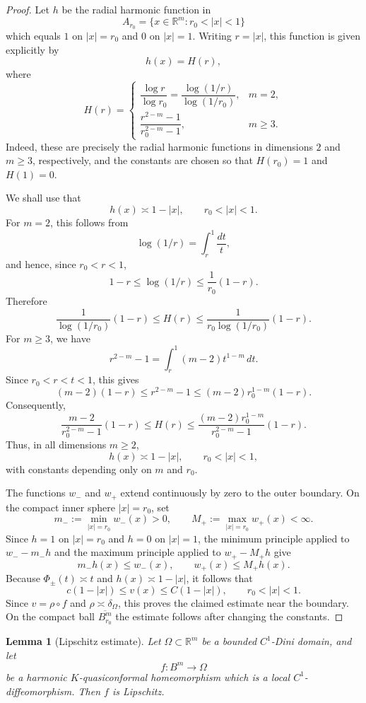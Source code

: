 \documentclass[11pt]{amsart}
\newtheorem{lemma}[theorem]{Lemma}
\theoremstyle{definition}
\theoremstyle{remark}
\newcommand{\R}{\mathbb R}
\begin{document}
\begin{proof}
Let \(h\) be the radial harmonic function in
\[
        A_{r_0}=\{x\in \mathbb R^m:r_0<|x|<1\}
\]
which equals \(1\) on \(|x|=r_0\) and \(0\) on \(|x|=1\).  Writing
\(r=|x|\), this function is given explicitly by
\[
h(x)=H(r),
\]
where
\[
H(r)=
\begin{cases}
\dfrac{\log r}{\log r_0}
      =\dfrac{\log(1/r)}{\log(1/r_0)}, & m=2, \\[1.2em]
\dfrac{r^{2-m}-1}{r_0^{2-m}-1}, & m\ge 3 .
\end{cases}
\]
Indeed, these are precisely the radial harmonic functions in dimensions
\(2\) and \(m\ge 3\), respectively, and the constants are chosen so that
\(H(r_0)=1\) and \(H(1)=0\).

We shall use that
\[
        h(x)\asymp 1-|x|,
        \qquad r_0<|x|<1 .
\]
For \(m=2\), this follows from
\[
        \log(1/r)=\int_r^1 \frac{dt}{t},
\]
and hence, since \(r_0<r<1\),
\[
        1-r \le \log(1/r)\le \frac{1}{r_0}(1-r).
\]
Therefore
\[
        \frac{1}{\log(1/r_0)}(1-r)
        \le H(r)
        \le
        \frac{1}{r_0\log(1/r_0)}(1-r).
\]
For \(m\ge 3\), we have
\[
        r^{2-m}-1
        =
        \int_r^1 (m-2)t^{1-m}\,dt .
\]
Since \(r_0<r<t<1\), this gives
\[
        (m-2)(1-r)
        \le r^{2-m}-1
        \le
        (m-2)r_0^{1-m}(1-r).
\]
Consequently,
\[
        \frac{m-2}{r_0^{2-m}-1}(1-r)
        \le H(r)
        \le
        \frac{(m-2)r_0^{1-m}}{r_0^{2-m}-1}(1-r).
\]
Thus, in all dimensions \(m\ge 2\),
\[
        h(x)\asymp 1-|x|,
        \qquad r_0<|x|<1,
\]
with constants depending only on \(m\) and \(r_0\).


The functions \(w_-\) and \(w_+\) extend continuously by zero to the
outer boundary. On the compact inner sphere \(|x|=r_0\), set
\[
        m_-:=\min_{|x|=r_0}w_-(x)>0,
        \qquad
        M_+:=\max_{|x|=r_0}w_+(x)<\infty.
\]
Since \(h=1\) on \(|x|=r_0\) and \(h=0\) on \(|x|=1\), the minimum
principle applied to \(w_- -m_-h\) and the maximum principle applied to
\(w_+-M_+h\) give
\[
        m_-h(x)\le w_-(x),
        \qquad
        w_+(x)\le M_+h(x).
\]
Because \(\Phi_\pm(t)\asymp t\) and \(h(x)\asymp1-|x|\), it follows
that
\[
        c(1-|x|)\le v(x)\le C(1-|x|),
        \qquad r_0<|x|<1 .
\]
Since \(v=\rho\circ f\) and \(\rho\asymp\delta_\Omega\), this proves the
claimed estimate near the boundary.  On the compact ball
\(\overline{B^m_{r_0}}\) the estimate follows after changing the constants.
\end{proof}

\begin{lemma}[Lipschitz estimate]
\label{lem:lipschitz-dini}
Let \(\Omega\subset\R^m\) be a bounded \(C^1\)-Dini domain, and let
\[
        f:B^m\to\Omega
\]
be a harmonic \(K\)-quasiconformal homeomorphism which is a local
\(C^1\)-diffeomorphism. Then \(f\) is Lipschitz.
\end{lemma}
\end{document}
